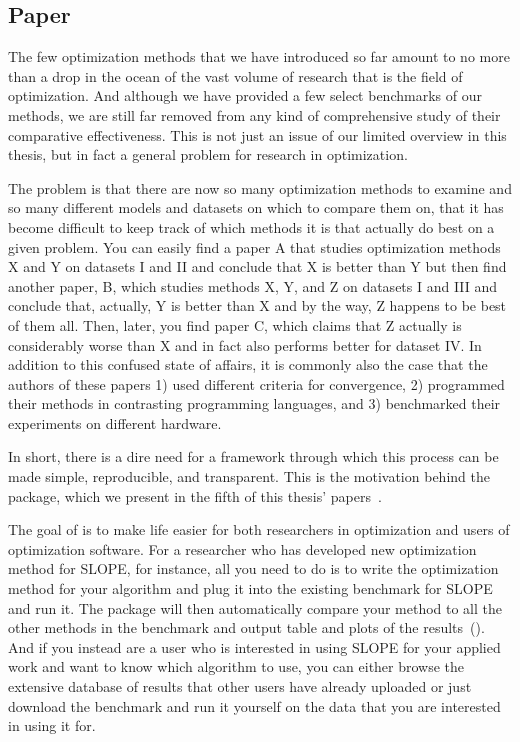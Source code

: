 \subsection{Paper \IV}

The few optimization methods that we have introduced so far amount to no more than a drop in the ocean of the vast volume of research that is the field of optimization. And although we have provided a few select benchmarks of our methods, we are still far removed from any kind of comprehensive study of their comparative effectiveness. This is not just an issue of our limited overview in this thesis, but in fact a general problem for research in optimization.

The problem is that there are now so many optimization methods to examine and so many different models and datasets on which to compare them on, that it has become difficult to keep track of which methods it is that actually do best on a given problem. You can easily find a paper A that studies optimization methods X and Y on datasets I and II and conclude that X is better than Y but then find another paper, B, which studies methods X, Y, and Z on datasets I and III and conclude that, actually, Y is better than X and by the way, Z happens to be best of them all. Then, later, you find paper C, which claims that Z actually is considerably worse than X and in fact also performs better for dataset IV. In addition to this confused state of affairs, it is commonly also the case that the authors of these papers 1) used different criteria for convergence, 2) programmed their methods in contrasting programming languages, and 3) benchmarked their experiments on different hardware.

In short, there is a dire need for a framework through which this process can be made simple, reproducible, and transparent. This is the motivation behind the  package, which we present in the fifth of this thesis' papers~\parencite{moreau2022a}.

The goal of  is to make life easier for both researchers in optimization and users of optimization software. For a researcher who has developed new optimization method for SLOPE, for instance, all you need to do is to write the optimization method for your algorithm and plug it into the existing  benchmark for SLOPE and run it. The package will then automatically compare your method to all the other methods in the benchmark and output table and plots of the results~(). And if you instead are a user who is interested in using SLOPE for your applied work and want to know which algorithm to use, you can either browse the extensive database of results that other users have already uploaded or just download the benchmark and run it yourself on the data that you are interested in using it for.

